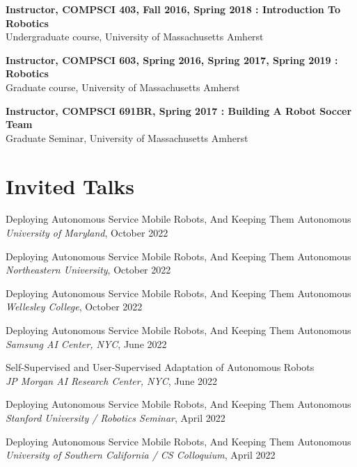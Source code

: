 \documentclass[Times]{article}
\begin{document}
{\bf Instructor, COMPSCI 403, Fall 2016, Spring 2018 : Introduction To
Robotics}\\
Undergraduate course, University of Massachusetts Amherst

{\bf Instructor, COMPSCI 603, Spring 2016, Spring 2017, Spring 2019 : Robotics}\\
\hfill Graduate course, University of Massachusetts Amherst

{\bf Instructor, COMPSCI 691BR, Spring 2017 : Building A Robot Soccer Team}\\
Graduate Seminar, University of Massachusetts Amherst

\begin{comment}
Updates:
5. Find all SPC, PC appointments
6. List all students
\end{comment}

\section*{Invited Talks}

Deploying Autonomous Service Mobile Robots, And Keeping Them Autonomous
\\
{\em University of Maryland}, October 2022

Deploying Autonomous Service Mobile Robots, And Keeping Them Autonomous
\\
{\em Northeastern University}, October 2022

Deploying Autonomous Service Mobile Robots, And Keeping Them Autonomous
\\
{\em Wellesley College}, October 2022

Deploying Autonomous Service Mobile Robots, And Keeping Them Autonomous
\\
{\em Samsung AI Center, NYC}, June 2022

Self-Supervised and User-Supervised Adaptation of Autonomous Robots
\\
{\em JP Morgan AI Research Center, NYC}, June 2022

Deploying Autonomous Service Mobile Robots, And Keeping Them Autonomous
\\
{\em Stanford University / Robotics Seminar}, April 2022

Deploying Autonomous Service Mobile Robots, And Keeping Them Autonomous
\\
{\em University of Southern California / CS Colloquium}, April 2022
\end{document}
